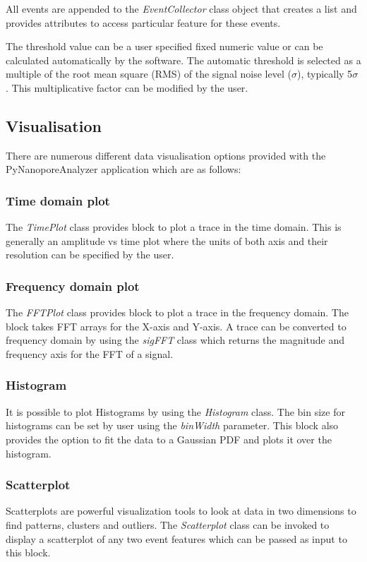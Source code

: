 \documentclass[journal]{IEEEtran}
\begin{document}
All events are appended to the \textit{EventCollector} class object that creates a list and provides attributes to access particular feature for these events.

The threshold value can be a user specified fixed numeric value or can be calculated automatically by the software. The automatic threshold is selected as a multiple of the root mean square (RMS) of the signal noise level ($\sigma$), typically 5$\sigma$ \cite{plesaDataAnalysisMethods2015}. This multiplicative factor can be modified by the user.

\subsection{Visualisation}
There are numerous different data visualisation options provided with the PyNanoporeAnalyzer application which are as follows:

\subsubsection{Time domain plot}
The \textit{TimePlot} class provides block to plot a trace in the time domain. This is generally an amplitude vs time plot where the units of both axis and their resolution can be specified by the user.

\subsubsection{Frequency domain plot}
The \textit{FFTPlot} class provides block to plot a trace in the frequency domain. The block takes FFT arrays for the X-axis and Y-axis. A trace can be converted to frequency domain by using the \textit{sigFFT} class which returns the magnitude and frequency axis for the FFT of a signal.

\subsubsection{Histogram}
It is possible to plot Histograms by using the \textit{Histogram} class. The bin size for histograms can be set by user using the \textit{binWidth} parameter. This block also provides the option to fit the data to a Gaussian PDF and plots it over the histogram.

\subsubsection{Scatterplot}
Scatterplots are powerful visualization tools to look at data in two dimensions to find patterns, clusters and outliers. The \textit{Scatterplot} class can be invoked to display a scatterplot of any two event features which can be passed as input to this block.
\end{document}
